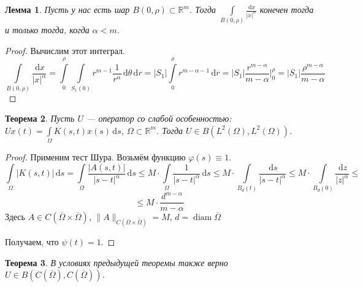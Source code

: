 \documentclass[11pt,openany,a4paper]{scrartcl}
\theoremstyle{plain}
\newtheorem{theorem}{Теорема}[section]
\newtheorem{lemma}[theorem]{Лемма}
\theoremstyle{definition}
\newcommand\mb{\mathbb}
\newcommand\real{\mb R}
\newcommand{\dif}{\, \mathrm d}
\DeclareMathOperator{\diam}{diam}
\begin{document}
\begin{lemma}
    Пусть у нас есть шар $B(0, \rho) \subset \real^m$. Тогда
    $\int\limits_{B(0, \rho)} \frac{\dif x}{|x|^\alpha}$ конечен тогда и только 
    тогда, когда $\alpha < m$.
\end{lemma}
\begin{proof}
    Вычислим этот интеграл.
    $$
    \int\limits_{B(0, \rho)} \frac{\dif x}{|x|^\alpha} =
    \int\limits_0^\rho \int\limits_{S_1(0)}
    r^{m-1}\frac{1}{r^\alpha}\dif \theta \dif r =
    |S_1| \int\limits_0^\rho r^{m - \alpha - 1} \dif r =
    |S_1| \frac{r^{m - \alpha}}{m - \alpha}\bigg|_0^\rho =
    |S_1|\frac{\rho^{m - \alpha}}{m - \alpha}
    $$
\end{proof}
\begin{theorem}
    Пусть $U$ — оператор со слабой особенностью:
    $Ux(t) = \int\limits_\Omega K(s,t) x(s) \dif s$, $\Omega \subset \real^m$.
    Тогда $U\in B(L^2(\Omega), L^2(\Omega))$.
\end{theorem}
\begin{proof}
    Применим тест Шура. Возьмём функцию $\varphi(s) \equiv 1$.
    $$
    \int\limits_\Omega|K(s, t)|\dif s =
    \int\limits_\Omega \frac{|A(s,t)|}{|s-t|^\alpha}\dif s \leqslant
    M\cdot \int\limits_\Omega \frac{1}{|s-t|^\alpha}\dif s \leqslant
    M\cdot \int\limits_{B_d(t)} \frac{\dif s}{|s - t|^\alpha} \leqslant
    M \cdot \int\limits_{B_d(0)} \frac{\dif z}{|z|^\alpha} \leqslant
    $$
    $$
    \leqslant M \cdot \frac{d^{m - \alpha}}{m - \alpha}
    $$
    Здесь $A \in C(\overline\Omega \times \overline\Omega)$,
    $\|A\|_{C(\overline\Omega \times \overline\Omega)} = M$,
    $d = \diam \overline\Omega$
    
    Получаем, что $\psi(t) = 1$.
\end{proof}
\begin{theorem}
    В условиях предыдущей теоремы также верно
    $U \in B(C(\overline\Omega), C(\overline\Omega))$.
\end{theorem}
\end{document}
